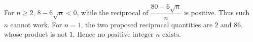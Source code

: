For $n\ge2$, $8-6\sqrt n<0$, while the reciprocal of $\dfrac{80+6\sqrt n}{n}$ is positive. Thus such $n$ cannot work. For $n=1$, the two proposed reciprocal quantities are $2$ and $86$, whose product is not $1$. Hence $\boxed{\text{no positive integer }n\text{ exists}}$.
